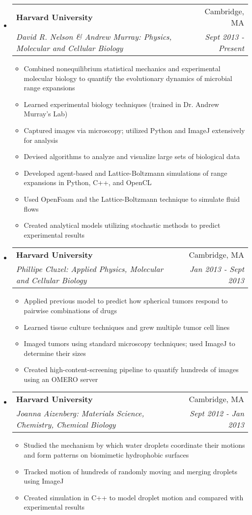 \documentclass[letterpaper,11pt]{article}
\makeatletter
\newcommand{\resitem}[1]{\item #1 \vspace{-2pt}}
\newcommand{\ressubheading}[4]{\vspace{-14pt}
\begin{tabular*}{7.0in}{l@{\extracolsep{\fill}}r}
                \\
                \textbf{#1} & #2 \\
                \textit{#3} & \textit{#4} \\
\end{tabular*}\vspace{-6pt}}
\makeatother
\begin{document}
\begin{itemize}

\item
        \ressubheading{Harvard University}{Cambridge, MA}{David R. Nelson \& Andrew Murray: Physics, Molecular and Cellular Biology}{Sept 2013 - Present}
\begin{itemize}
        \resitem{Combined nonequilibrium statistical mechanics and experimental molecular biology to quantify the evolutionary dynamics of microbial range expansions}
        \resitem{Learned experimental biology techniques (trained in Dr. Andrew Murray's Lab)}
        \resitem{Captured images via microscopy; utilized Python and ImageJ extensively for analysis}
        \resitem{Devised algorithms to analyze and visualize large sets of biological data}
        \resitem{Developed agent-based and Lattice-Boltzmann simulations of range expansions in Python, C++, and OpenCL}
        \resitem{Used OpenFoam and the Lattice-Boltzmann technique to  simulate fluid flows}
        \resitem{Created analytical models utilizing stochastic methods to predict experimental results}
\end{itemize}

\item
        \ressubheading{Harvard University}{Cambridge, MA}{Phillipe Cluzel: Applied Physics, Molecular and Cellular Biology }{Jan 2013 - Sept 2013}
\begin{itemize}
        \resitem{Applied previous model to predict how spherical tumors respond to pairwise combinations of drugs}
        \resitem{Learned tissue culture techniques and grew multiple tumor cell lines}
        \resitem{Imaged tumors using standard microscopy techniques; used ImageJ to determine their sizes}
        \resitem{Created high-content-screening pipeline to quantify hundreds of images using an OMERO server}
\end{itemize}

\item
        \ressubheading{Harvard University}{Cambridge, MA}{Joanna Aizenberg: Materials Science, Chemistry, Chemical Biology}{Sept 2012 - Jan 2013}
\begin{itemize}
        \resitem{Studied the mechanism by which water droplets coordinate their motions and form patterns on biomimetic hydrophobic surfaces}
        \resitem{Tracked motion of hundreds of randomly moving and merging droplets using ImageJ}
        \resitem{Created simulation in C++ to model droplet motion and compared with experimental results}
\end{itemize}

\end{itemize}
\end{document}
